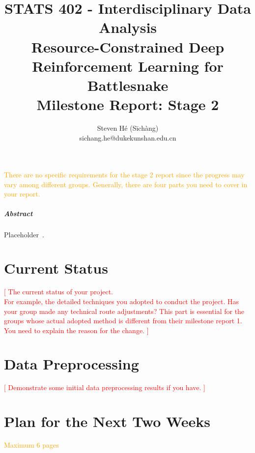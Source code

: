 \documentclass[a4paper]{article}
\title{STATS 402 - Interdisciplinary Data Analysis\\
    Resource-Constrained Deep Reinforcement Learning for Battlesnake\\
    Milestone Report: Stage 2
}
\author{Steven Hé (Sīchàng)\\
    sichang.he@dukekunshan.edu.cn
}
\newcommand{\todo}[1]{\textcolor{red}{[ #1 ]}}
\newcommand{\instruction}[1]{\textcolor{orange}{#1}}
\begin{document}
\maketitle

\instruction{
    There are no specific requirements for the stage 2 report since the progress may vary among different groups. Generally, there are four parts you need to cover in your report.
}

\subparagraph{Abstract}

Placeholder~\cite{battlesnake}.

\section{Current Status}

\todo{The current status of your project.\\
    For example, the detailed techniques you adopted to conduct the project. Has your group made any technical route adjustments? This part is essential for the groups whose actual adopted method is different from their milestone report 1. You need to explain the reason for the change.
}

\section{Data Preprocessing}

\todo{Demonstrate some initial data preprocessing results if you have.}

\section{Plan for the Next Two Weeks}

\instruction{Maximum 6 pages}

\printbibliography
\end{document}

